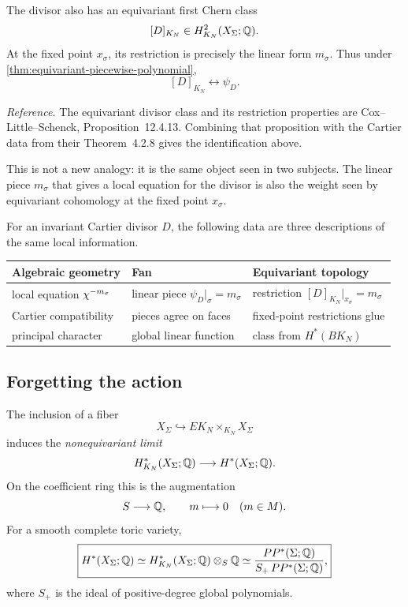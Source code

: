 The divisor also has an equivariant first Chern class
\[
[D]_{K_N}\in H_{K_N}^2(X_\Sigma;\mathbb{Q}).
\]
At the fixed point \(x_\sigma\), its restriction is precisely the
linear form \(m_\sigma\). Thus under
\cref{thm:equivariant-piecewise-polynomial},
\[
\boxed{
[D]_{K_N}
\longleftrightarrow
\psi_D.
}
\]

\noindent
\textit{Reference.}
The equivariant divisor class and its restriction properties are
Cox--Little--Schenck, Proposition~12.4.13. Combining that proposition
with the Cartier data from their Theorem~4.2.8 gives the identification
above.

This is not a new analogy: it is the same object seen in two subjects.
The linear piece \(m_\sigma\) that gives a local equation for the
divisor is also the weight seen by equivariant cohomology at the fixed
point \(x_\sigma\).

\begin{threedictionaries}
For an invariant Cartier divisor \(D\), the following data are three
descriptions of the same local information.

\medskip

\begin{center}
\small
\begin{tabularx}{\linewidth}{@{}
  >{\raggedright\arraybackslash}X
  >{\raggedright\arraybackslash}X
  >{\raggedright\arraybackslash}X@{}}
\toprule
\textbf{Algebraic geometry}
&
\textbf{Fan}
&
\textbf{Equivariant topology}
\\
\midrule
local equation \(\chi^{-m_\sigma}\)
&
linear piece \(\psi_D|_\sigma=m_\sigma\)
&
restriction \([D]_{K_N}|_{x_\sigma}=m_\sigma\)
\\
Cartier compatibility
&
pieces agree on faces
&
fixed-point restrictions glue
\\
principal character
&
global linear function
&
class from \(H^*(BK_N)\)
\\
\bottomrule
\end{tabularx}
\end{center}
\end{threedictionaries}

\subsection{Forgetting the action}

The inclusion of a fiber
\[
X_\Sigma\hookrightarrow EK_N\times_{K_N}X_\Sigma
\]
induces the \emph{nonequivariant limit}
\[
H_{K_N}^*(X_\Sigma;\mathbb{Q})
\longrightarrow
H^*(X_\Sigma;\mathbb{Q}).
\]
On the coefficient ring this is the augmentation
\[
S\longrightarrow\mathbb{Q},
\qquad
m\longmapsto0
\quad(m\in M).
\]
For a smooth complete toric variety,
\[
\boxed{
H^*(X_\Sigma;\mathbb{Q})
\simeq
H_{K_N}^*(X_\Sigma;\mathbb{Q})\otimes_S\mathbb{Q}
\simeq
\frac{PP^*(\Sigma;\mathbb{Q})}{S_+\,PP^*(\Sigma;\mathbb{Q})},
}
\]
where \(S_+\) is the ideal of positive-degree global polynomials.

